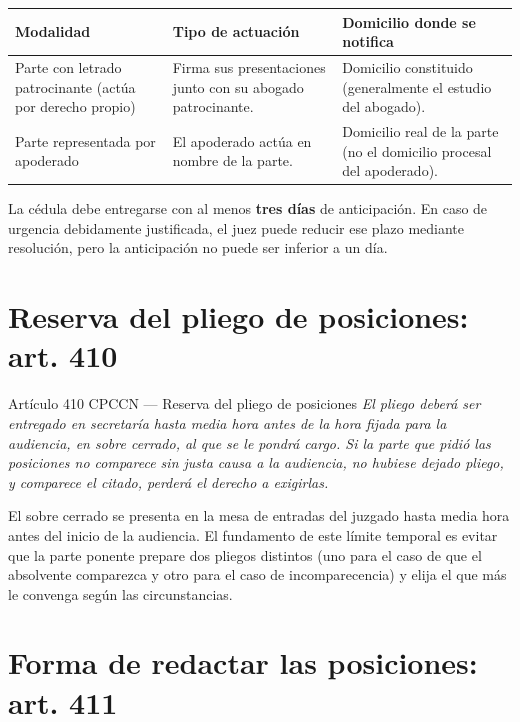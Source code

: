 \documentclass[12pt,oneside]{book}
\renewcommand{\arraystretch}{1.15}
\begin{document}
\begin{center}
\renewcommand{\arraystretch}{1.3}
\begin{tabularx}{\textwidth}{
    >{\raggedright\arraybackslash}X
    >{\raggedright\arraybackslash}X
    >{\raggedright\arraybackslash}X}
\toprule
\textbf{Modalidad} & \textbf{Tipo de actuación} & \textbf{Domicilio donde se notifica} \\
\midrule
Parte con letrado patrocinante (actúa por derecho propio) & Firma sus presentaciones junto con su abogado patrocinante. & Domicilio constituido (generalmente el estudio del abogado). \\
\addlinespace
Parte representada por apoderado & El apoderado actúa en nombre de la parte. & Domicilio real de la parte (no el domicilio procesal del apoderado). \\
\bottomrule
\end{tabularx}
\end{center}

La cédula debe entregarse con al menos \textbf{tres días} de anticipación. En caso de urgencia debidamente justificada, el juez puede reducir ese plazo mediante resolución, pero la anticipación no puede ser inferior a un día.

\section{Reserva del pliego de posiciones: art. 410}

\begin{norma}{Artículo 410 CPCCN --- Reserva del pliego de posiciones}
\textit{El pliego deberá ser entregado en secretaría hasta media hora antes de la hora fijada para la audiencia, en sobre cerrado, al que se le pondrá cargo. Si la parte que pidió las posiciones no comparece sin justa causa a la audiencia, no hubiese dejado pliego, y comparece el citado, perderá el derecho a exigirlas.}
\end{norma}

El sobre cerrado se presenta en la mesa de entradas del juzgado hasta media hora antes del inicio de la audiencia. El fundamento de este límite temporal es evitar que la parte ponente prepare dos pliegos distintos (uno para el caso de que el absolvente comparezca y otro para el caso de incomparecencia) y elija el que más le convenga según las circunstancias.

\section{Forma de redactar las posiciones: art. 411}
\end{document}
